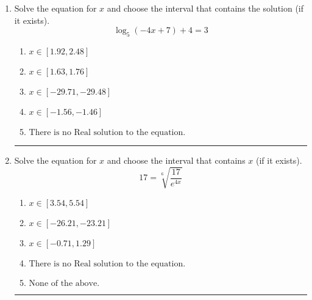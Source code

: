 \documentclass[14pt]{extbook}
\newcommand{\litem}[1]{\item#1\hspace*{-1cm}\rule{\textwidth}{0.4pt}}
\begin{document}
\begin{enumerate}
{\begin{enumerate}[label=\Alph*.]
\end{enumerate} }
\litem{
Solve the equation for $x$ and choose the interval that contains the solution (if it exists).\[ \log_{5}{(-4x+7)}+4 = 3 \]\begin{enumerate}[label=\Alph*.]
\item \( x \in [1.92, 2.48] \)
\item \( x \in [1.63, 1.76] \)
\item \( x \in [-29.71, -29.48] \)
\item \( x \in [-1.56, -1.46] \)
\item \( \text{There is no Real solution to the equation.} \)

\end{enumerate} }
\litem{
 Solve the equation for $x$ and choose the interval that contains $x$ (if it exists).\[  17 = \sqrt[6]{\frac{17}{e^{4x}}} \]\begin{enumerate}[label=\Alph*.]
\item \( x \in [3.54, 5.54] \)
\item \( x \in [-26.21, -23.21] \)
\item \( x \in [-0.71, 1.29] \)
\item \( \text{There is no Real solution to the equation.} \)
\item \( \text{None of the above.} \)

\end{enumerate} }
\end{enumerate}
\end{document}
